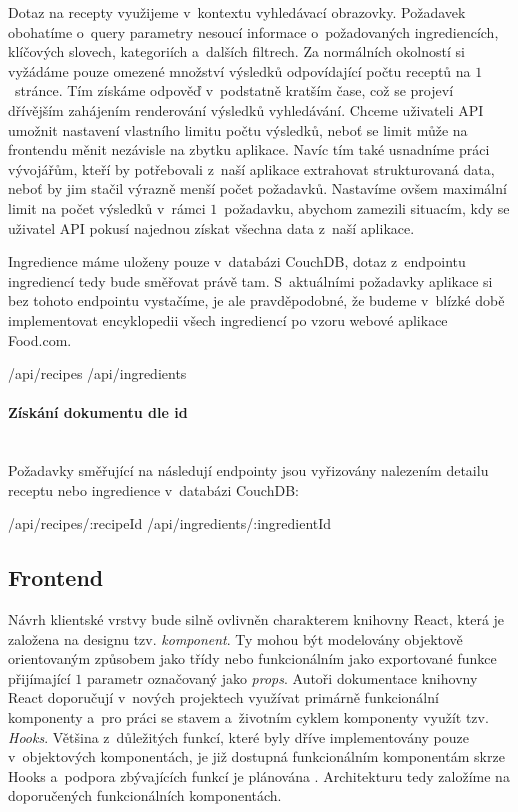 Dotaz na recepty využijeme v~kontextu vyhledávací obrazovky. Požadavek obohatíme o~query parametry nesoucí informace o~požadovaných ingrediencích, klíčových slovech, kategoriích a~dalších filtrech. Za normálních okolností si vyžádáme pouze omezené množství výsledků odpovídající počtu receptů na $1$~stránce. Tím získáme odpověď v~podstatně kratším čase, což se projeví dřívějším zahájením renderování výsledků vyhledávání. Chceme uživateli API umožnit nastavení vlastního limitu počtu výsledků, neboť se limit může na frontendu měnit nezávisle na zbytku aplikace. Navíc tím také usnadníme práci vývojářům, kteří by potřebovali z~naší aplikace extrahovat strukturovaná data, neboť by jim stačil výrazně menší počet požadavků. Nastavíme ovšem maximální limit na počet výsledků v~rámci $1$~požadavku, abychom zamezili situacím, kdy se uživatel API pokusí najednou získat všechna data z~naší aplikace.

Ingredience máme uloženy pouze v~databázi CouchDB, dotaz z~endpointu ingrediencí tedy bude směřovat právě tam. S~aktuálními požadavky aplikace si bez tohoto endpointu vystačíme, je ale pravděpodobné, že budeme v~blízké době implementovat encyklopedii všech ingrediencí po vzoru webové aplikace Food.com.

\begin{code}
/api/recipes
/api/ingredients
\end{code}

\paragraph{Získání dokumentu dle id}\mbox{}\\

Požadavky směřující na následují endpointy jsou vyřizovány nalezením detailu receptu nebo ingredience v~databázi CouchDB:

\begin{code}
/api/recipes/:recipeId
/api/ingredients/:ingredientId
\end{code}

\subsection{Frontend}

Návrh klientské vrstvy bude silně ovlivněn charakterem knihovny React, která je založena na designu tzv. \emph{komponent}. Ty mohou být modelovány objektově orientovaným způsobem jako třídy nebo funkcionálním jako exportované funkce přijímající $1$ parametr označovaný jako \emph{props}. Autoři dokumentace knihovny React doporučují v~nových projektech využívat primárně funkcionální komponenty a~pro práci se stavem a~životním cyklem komponenty využít tzv. \emph{Hooks}. Většina z~důležitých funkcí, které byly dříve implementovány pouze v~objektových komponentách, je již dostupná funkcionálním komponentám skrze Hooks a~podpora zbývajících funkcí je plánována \citep{class-or-functional}. Architekturu tedy založíme na doporučených funkcionálních komponentách.

